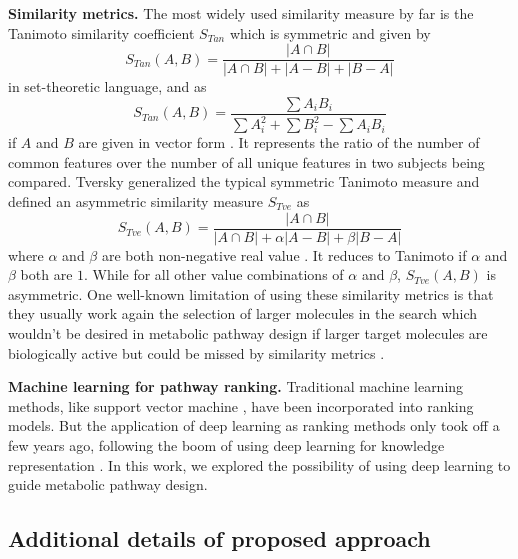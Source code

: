 \documentclass{article}
\begin{document}
\textbf{Similarity metrics.}
The most widely used similarity measure by far is the Tanimoto similarity coefficient $S_{Tan}$ which is symmetric and given by \citep{maggiora2011molecular} 
\begin{equation}
    S_{Tan}(A,B) = \frac{|A\cap B|}{|A\cap B| + |A-B| + |B-A|}
\end{equation}
in set-theoretic language, and as \citep{coley2017computer}
\begin{equation}
    S_{Tan}(A,B) = \frac{\sum A_i B_i}{\sum A_i^2 + \sum B_i^2 - \sum A_i B_i}
\end{equation}
if $A$ and $B$ are given in vector form \citep{tanimoto1958elementary}. It represents the ratio of the number of common features over the number of all unique features in two subjects being compared.
Tversky generalized the typical symmetric Tanimoto measure and defined an asymmetric similarity measure $S_{Tve}$ as 
\begin{equation}
    S_{Tve}(A,B) = \frac{|A\cap B|}{|A\cap B| + \alpha|A-B| + \beta|B-A|}
\end{equation}
where $\alpha$ and $\beta$ are both non-negative real value \citep{tversky1977features}. It reduces to Tanimoto if $\alpha$ and $\beta$ both are $1$. While for all other value combinations of $\alpha$ and $\beta$, $S_{Tve}(A,B)$ is asymmetric. 
One well-known limitation of using these similarity metrics is that they usually work again the selection of larger molecules in the search which wouldn't be desired in metabolic pathway design if larger target molecules are biologically active but could be missed by similarity metrics \citep{maggiora2011molecular, maggiora2014molecular}. 

\textbf{Machine learning for pathway ranking.}
Traditional machine learning methods, like support vector machine \citep{delepine2018retropath2}, have been incorporated into ranking models. But the application of deep learning as ranking methods only took off a few years ago, following the boom of using deep learning for knowledge representation \citep{lecun2015deep, coley2017prediction}.
In this work, we explored the possibility of using deep learning to guide metabolic pathway design.



\subsection{Additional details of proposed approach} \label{sec:SI-methods}
\end{document}
